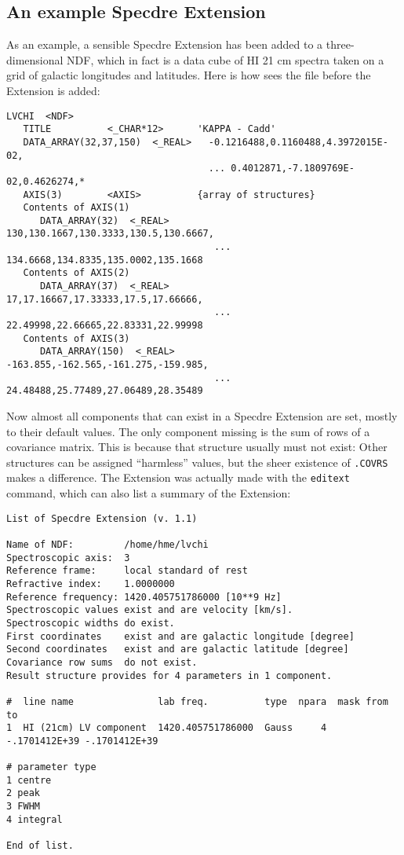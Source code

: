 
\subsection{An example Specdre Extension}

   As an example, a sensible Specdre Extension has been added to a
   three-dimensional NDF, which in fact is a data cube of HI 21 cm
   spectra taken on a grid of galactic longitudes and latitudes. Here is
   how
{\tt{}}
   sees the file before the Extension is added:

\small
\begin{verbatim}
LVCHI  <NDF>
   TITLE          <_CHAR*12>      'KAPPA - Cadd'
   DATA_ARRAY(32,37,150)  <_REAL>   -0.1216488,0.1160488,4.3972015E-02,
                                    ... 0.4012871,-7.1809769E-02,0.4626274,*
   AXIS(3)        <AXIS>          {array of structures}
   Contents of AXIS(1)
      DATA_ARRAY(32)  <_REAL>        130,130.1667,130.3333,130.5,130.6667,
                                     ... 134.6668,134.8335,135.0002,135.1668
   Contents of AXIS(2)
      DATA_ARRAY(37)  <_REAL>        17,17.16667,17.33333,17.5,17.66666,
                                     ... 22.49998,22.66665,22.83331,22.99998
   Contents of AXIS(3)
      DATA_ARRAY(150)  <_REAL>       -163.855,-162.565,-161.275,-159.985,
                                     ... 24.48488,25.77489,27.06489,28.35489
\end{verbatim}
\normalsize

   Now almost all components that can exist in a Specdre Extension are
   set, mostly to their default values. The only component missing is
   the sum of rows of a covariance matrix. This is because that
   structure usually must not exist: Other structures can be assigned
   ``harmless'' values, but the sheer existence of {\tt .COVRS} makes a
   difference. The Extension was actually made with the {\tt editext}
   command, which can also list a summary of the Extension:

\small
\begin{verbatim}
List of Specdre Extension (v. 1.1)

Name of NDF:         /home/hme/lvchi
Spectroscopic axis:  3
Reference frame:     local standard of rest
Refractive index:    1.0000000
Reference frequency: 1420.405751786000 [10**9 Hz]
Spectroscopic values exist and are velocity [km/s].
Spectroscopic widths do exist.
First coordinates    exist and are galactic longitude [degree]
Second coordinates   exist and are galactic latitude [degree]
Covariance row sums  do not exist.
Result structure provides for 4 parameters in 1 component.

#  line name               lab freq.          type  npara  mask from     to
1  HI (21cm) LV component  1420.405751786000  Gauss     4  -.1701412E+39 -.1701412E+39

# parameter type
1 centre
2 peak
3 FWHM
4 integral

End of list.
\end{verbatim}
\normalsize

